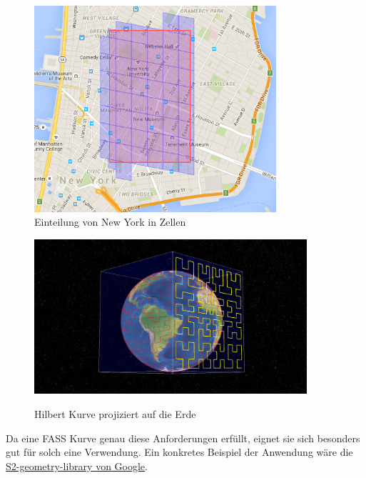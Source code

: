 \documentclass[course=erap]{aspdoc}
\begin{document}
\begin{figure}[h]
    \centering
    \begin{minipage}{0.45\textwidth}
        \centering
        \includegraphics[width=0.8\textwidth]{Map}\\
        \caption{Einteilung von New York in Zellen \cite{Kreiss2016}}
        \label{fig:Gmaps}
    \end{minipage}\hfill
    \begin{minipage}{0.45\textwidth}
        \centering
        \includegraphics[width=0.9\textwidth]{Earth} \\
        \caption{Hilbert Kurve projiziert auf die Erde \cite{Kreiss2016}}
        \label{fig:hilbertCurveOnEarth}
    \end{minipage}
\end{figure}

Da eine FASS Kurve genau diese Anforderungen erfüllt, eignet sie sich besonders gut für solch eine Verwendung. Ein konkretes Beispiel der Anwendung wäre die \href{https://code.google.com/archive/p/s2-geometry-library/}{S2-geometry-library von Google}. 
\end{document}
